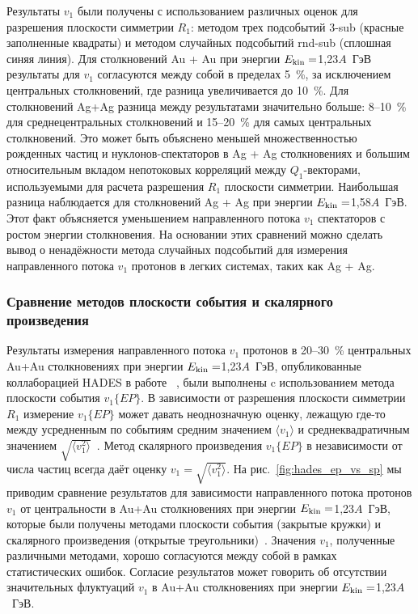 Результаты $v_1$ были получены с использованием различных оценок для  разрешения плоскости симметрии $R_1$: методом трех подсобытий 3-sub (красные заполненные квадраты) и методом случайных подсобытий  rnd-sub (сплошная синяя линия). 
Для столкновений Au + Au при энергии $E_{\rm kin}=$1,23$A$~ГэВ результаты для $v_1$ согласуются между собой в пределах 5~\%, за исключением центральных столкновений, где разница увеличивается до 10~\%. 
Для столкновений Ag+Ag разница между результатами значительно больше: 8--10~\%  для среднецентральных столкновений и 
15--20~\% для самых центральных столкновений. 
Это может быть объяснено меньшей множественностью рожденных частиц и нуклонов-спектаторов в Ag + Ag столкновениях и большим относительным вкладом непотоковых корреляций между $Q_1$-векторами, используемыми для расчета разрешения $R_1$ плоскости симметрии.
Наибольшая разница  наблюдается для столкновений Ag + Ag при энергии $E_{\rm kin}=$1,58$A$~ГэВ. Этот факт объясняется уменьшением направленного потока $v_1$ спектаторов
с ростом энергии столкновения.
На основании этих сравнений можно сделать вывод о ненадёжности метода случайных подсобытий для измерения направленного потока $v_1$ протонов в легких системах, таких как Ag + Ag.
%

\subsubsection{Сравнение методов плоскости события и скалярного произведения}

Результаты измерения направленного потока $v_1$ протонов в 20--30~\% центральных Au+Au столкновениях  при энергии $E_{\rm kin}=$1,23$A$~ГэВ, опубликованные коллаборацией HADES  в работе ~\cite{HADES:2020lob}, были выполнены c использованием метода плоскости события $v_1\{EP\}$.  
В зависимости от разрешения плоскости симметрии $R_1$ измерение $v_1\{EP\}$ может давать  неоднозначную оценку, лежащую где-то между усредненным по событиям средним значением $\langle v_1 \rangle$ и среднеквадратичным значением $\sqrt{ \langle v_1^2 \rangle }$~\cite{Borghini:2001vi, Bhalerao:2006tp}.  
Метод скалярного произведения $v_1\{EP\}$ в независимости от числа частиц всегда 
даёт оценку $v_1 = \sqrt{ \langle v_1^2 \rangle }$. 
На рис.~\ref{fig:hades_ep_vs_sp}  мы приводим сравнение результатов для зависимости направленного потока протонов $v_1$ от центральности в Au+Au столкновениях  при энергии $E_{\rm kin}=$1,23$A$~ГэВ, которые были получены методами плоскости события (закрытые кружки) и скалярного произведения (открытые треугольники)~\cite{Mamaev:2020lpi}. 
Значения $v_1$, полученные различными методами, хорошо согласуются между собой в рамках  статистических ошибок. 
Согласие результатов может говорить об отсутствии значительных флуктуаций  $v_1$ в Au+Au столкновениях  при энергии $E_{\rm kin}=$1,23$A$~ГэВ.

